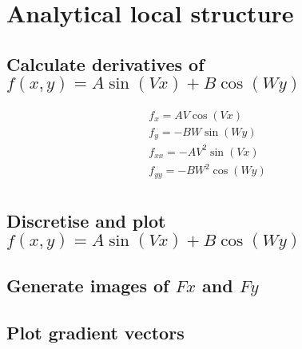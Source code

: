 \documentclass[abstract=true]{scrartcl}
\title{}
\author{Joris Stork, Lucas Swartsenburg}
\begin{document}
\maketitle


\section{Analytical local structure}

    \subsection{Calculate derivatives of $f(x,y)=A \sin(V x)+B \cos(W y)$}

        \begin{eqnarray}
            f_{x} = A V \cos(V x) \nonumber \\ 
            f_{y} = -B W \sin(W y) \nonumber \\
            f_{xx} = -A V^2 \sin(V x) \nonumber \\
            f_{yy} = -B W^2 \cos(W y) \nonumber \\
        \end{eqnarray}

    \subsection{Discretise and plot $f(x,y)=A \sin(V x)+B \cos(W y)$}


    \subsection{Generate images of $Fx$ and $Fy$}


    \subsection{Plot gradient vectors}
\end{document}
